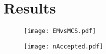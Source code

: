 \section{Results}
\label{sec:results}

\begin{figure}[htbp]
	\centering
	\texttt{[image: EMvsMCS.pdf]}
	\caption{}
	\label{fig:EMvsMCS}
\end{figure}

\begin{figure}[htbp]
	\centering
	\texttt{[image: nAccepted.pdf]}
	\caption{}
	\label{fig:nAccepted}
\end{figure}

